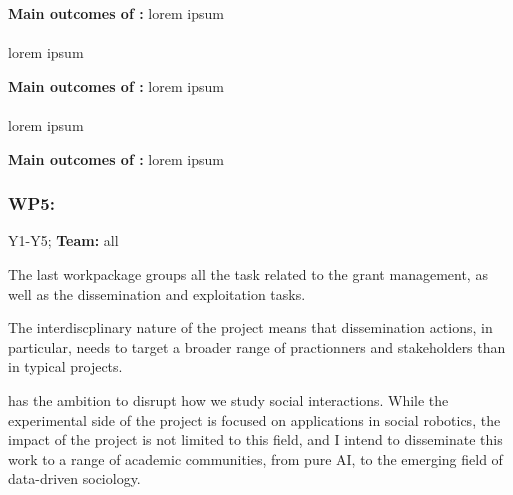 \begin{framed}
    {\noindent\bf Main outcomes of \tDB:} lorem ipsum 
\end{framed}

\paragraph{\TDD}

lorem ipsum

\begin{framed}
    {\noindent\bf Main outcomes of \tDD:} lorem ipsum 
\end{framed}


\paragraph{\TDC}

lorem ipsum

\begin{framed}
    {\noindent\bf Main outcomes of \tDC:} lorem ipsum 
\end{framed}



\subsubsection{WP5: \textbf{\WPZ}}

\begin{framed}
 Y1-Y5; {\bf Team:} all
\end{framed}

The last workpackage groups all the task related to the grant management, as
well as the dissemination and exploitation tasks.

The interdiscplinary nature of the project means that dissemination actions, in
particular, needs to target a broader range of practionners and stakeholders
than in typical projects.

\project has the ambition to disrupt how we study social interactions. While
the experimental side of the project is focused on applications in social
robotics, the impact of the project is not limited to this field, and I intend
to disseminate this work to a range of academic communities, from pure AI, to
the emerging field of data-driven sociology.


\paragraph{\TZA}

